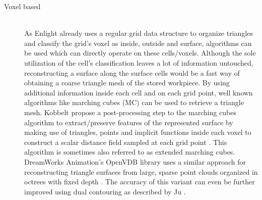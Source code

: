 \begin{description}
	\item[Voxel based] \hfill \\
	As Enlight already uses a regular grid data structure to organize triangles and classify the grid's voxel as inside, outside and surface, algorithms can be used which can directly operate on these cells/voxels.
	Although the sole utilization of the cell's classification leaves a lot of information untouched, reconstructing a surface along the surface cells would be a fast way of obtaining a coarse triangle mesh of the stored workpiece.
	By using additional information inside each cell and on each grid point, well known algorithms like marching cubes (MC) can be used to retrieve a triangle mesh.
	Kobbelt \etal propose a post-processing step to the marching cubes algorithm to extract/preserve features of the represented surface by making use of triangles, points and implicit functions inside each voxel to construct a scalar distance field sampled at each grid point \cite{extended_marching_cubes}.
	This algorithm is sometimes also referred to as extended marching cubes.
	DreamWorks Animation's OpenVDB library uses a similar approach for reconstructing triangle surfaces from large, sparse point clouds organized in octrees with fixed depth \cite{openvdb}.
	The accuracy of this variant can even be further improved using dual contouring as described by Ju \etal \cite{dual_contouring}.
\end{description}
